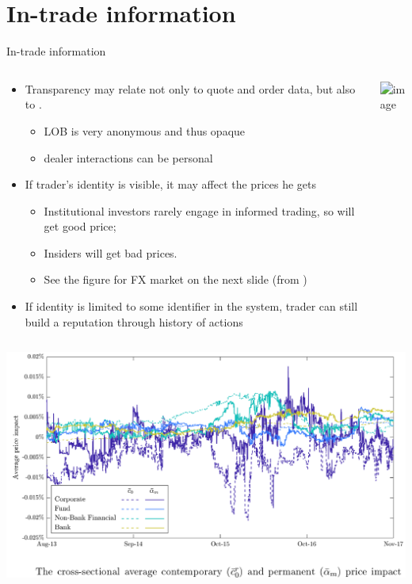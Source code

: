 \documentclass[english,10pt
,aspectratio=169
]{beamer}
\begin{document}
\section{In-trade information}

\begin{frame}{In-trade information}
	\begin{columns}
		\begin{column}{0.7\linewidth}
			{
				\begin{itemize}
					\item Transparency may relate not only to quote and order data, but also to .
					\begin{itemize}
						\item LOB is very anonymous and thus opaque
						\item dealer interactions can be personal
					\end{itemize}
					\pause
					\item If trader's identity is visible, it may affect the prices he gets
					\begin{itemize}
						\item Institutional investors rarely engage in informed trading, so will get good price;
						\item Insiders will get bad prices.
						\item See the figure for FX market on the next slide (from \cite{ranaldo_asymmetric_2019})
					\end{itemize}
					\pause
					\item If identity is limited to some identifier in the system, trader can still build a reputation through history of actions
				\end{itemize}
			}
		\end{column}
		\begin{column}{0.3\linewidth}
			\pause[1]
			\includegraphics<handout:0>[width=\linewidth]{pics/incognito}
		\end{column}
	\end{columns}
\end{frame}


\begin{frame}
	\includegraphics[width=\linewidth]{pics/RS}
\end{frame}
\end{document}
